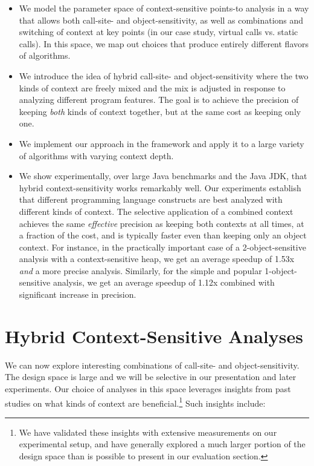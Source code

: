 \begin{itemize}
\item \todo{} We model the parameter space of context-sensitive points-to analysis in a way that allows both call-site- and object-sensitivity, as well as combinations and switching of context at key points (in our case study, virtual calls vs. static calls). In this space, we map out choices that produce entirely different flavors of algorithms.

\item We introduce the idea of hybrid call-site- and object-sensitivity where the two kinds of context are freely mixed and the mix is adjusted in response to analyzing different program features. The goal is to achieve the precision of keeping \emph{both} kinds of context together, but at the same cost as keeping only one.

\item We implement our approach in the \doop{} framework and apply it to a large variety of algorithms with varying context depth.

\item We show experimentally, over large Java benchmarks and the Java JDK, that hybrid context-sensitivity works remarkably well. Our experiments establish that different programming language constructs are best analyzed with different kinds of context. The selective application of a combined context achieves the same \emph{effective} precision as keeping both contexts at all times, at a fraction of the cost, and is typically faster even than keeping only an object context. For instance, in the practically important case of a 2-object-sensitive analysis with a context-sensitive heap, we get an average speedup of 1.53x \emph{and} a more precise analysis. Similarly, for the simple and popular 1-object-sensitive analysis, we get an average speedup of 1.12x combined with significant increase in precision.
\end{itemize}


\section{Hybrid Context-Sensitive Analyses}
\label{sec:hybrid:main}

We can now explore interesting combinations of call-site- and object-sensitivity. The design space is large and we will be selective in our presentation and later experiments. Our choice of analyses in this space leverages insights from past studies on what kinds of context are beneficial.\footnote{We have validated these insights with extensive measurements on our experimental setup, and have generally explored a much larger portion of the design space than is possible to present in our evaluation section.} Such insights include:

